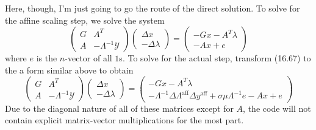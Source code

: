 \documentclass{article}
\newcommand{\openm}{\begin{pmatrix}}
\newcommand{\closem}{\end{pmatrix}}
\begin{document}
Here, though, I'm just going to go the route of the direct solution. To solve for the affine scaling step, we solve the system
\[\openm G&A^T\\A&-\Lambda^{-1}\mathscr{Y}\closem\openm\Delta x\\-\Delta\lambda\closem=\openm -Gx-A^T\lambda\\-Ax+e\closem\]
where $e$ is the $n$-vector of all $1$s. To solve for the actual step, transform (16.67) to the a form similar above to obtain
\[\openm G&A^T\\A&-\Lambda^{-1}\mathscr{Y}\closem\openm\Delta x\\-\Delta\lambda\closem=\openm-Gx-A^T\lambda\\-\Lambda^{-1}\Delta\Lambda^\text{aff}\Delta y^\text{aff}+\sigma\mu\Lambda^{-1}e-Ax+e\closem\]
Due to the diagonal nature of all of these matrices except for $A$, the code will not contain explicit matrix-vector multiplications for the most part.
\end{document}
